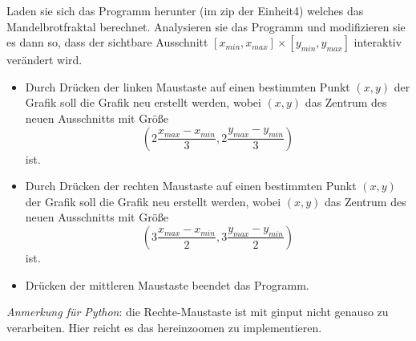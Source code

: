 \begin{aufg}[0]
Laden sie sich das Programm  herunter (im zip der Einheit4) welches das
Mandelbrotfraktal berechnet.
Analysieren sie das Programm und modifizieren sie es dann so, 
dass der sichtbare Ausschnitt $[x_{min},x_{max}]\times [y_{min},y_{max}]$
interaktiv verändert wird. 
\begin{itemize}
\item Durch Drücken der
linken Maustaste auf einen bestimmten Punkt $(x,y)$ der Grafik soll  die Grafik neu
erstellt werden, wobei $(x,y)$ das Zentrum des neuen Ausschnitts mit
Gr\"o{\ss}e 
\[ \left (  2\frac{x_{max}-x_{min}}{3},  2\frac{y_{max}-y_{min}}{3} \right)\]
ist.
\item Durch Drücken der
rechten Maustaste auf einen bestimmten Punkt $(x,y)$ der Grafik soll  die Grafik neu
erstellt werden, wobei $(x,y)$ das Zentrum des neuen Ausschnitts mit
Gr\"o{\ss}e 
\[ \left (  3\frac{x_{max}-x_{min}}{2},  3\frac{y_{max}-y_{min}}{2} \right)\]
ist.
\item Drücken der mittleren Maustaste beendet das Programm. 
\end{itemize} 
\textsl{Anmerkung für Python}: die Rechte-Maustaste ist mit ginput nicht genauso zu verarbeiten. Hier reicht es das hereinzoomen zu implementieren. 
\end{aufg}
